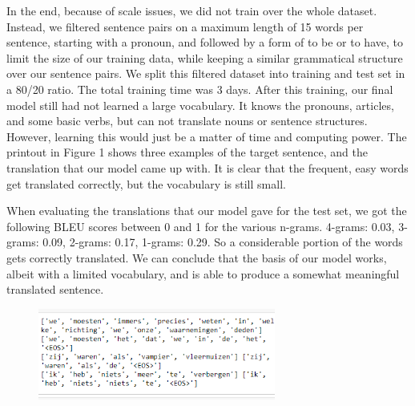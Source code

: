 \documentclass[11pt]{article}
\begin{document}
In the end, because of scale issues, we did not train over the whole dataset. Instead, we filtered sentence pairs on a maximum length of 15 words per sentence, starting with a pronoun, and followed by a form of to be or to have, to limit the size of our training data, while keeping a similar grammatical structure over our sentence pairs. We split this filtered dataset into training and test set in a 80/20 ratio. The total training time was 3 days. After this training, our final model still had not learned a large vocabulary. It knows the pronouns, articles, and some basic verbs, but can not translate nouns or sentence structures. However, learning this would just be a matter of time and computing power. The printout in Figure 1 shows three examples of the target sentence, and the translation that our model came up with. It is clear that the frequent, easy words get translated correctly, but the vocabulary is still small.

When evaluating the translations that our model gave for the test set, we got the following BLEU scores between 0 and 1 for the various n-grams. 4-grams: 0.03, 3-grams: 0.09, 2-grams: 0.17, 1-grams: 0.29. So a considerable portion of the words gets correctly translated. We can conclude that the basis of our model works, albeit with a limited vocabulary, and is able to produce a somewhat meaningful translated sentence.

\begin{figure}[h]
    \includegraphics[width=7.8cm]{Screenshot (3).png}
    \label{Figure 1}
\end{figure}
\end{document}
